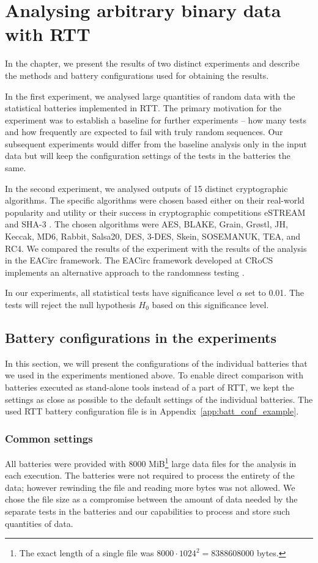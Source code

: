 \documentclass[
	digital,    %
	oneside,
	color,
	11pt,
	nocover,
	notable,
	nolof,
	nolot,
]{fithesis3}
\theoremstyle{definition}
\theoremstyle{remark}
\begin{document}
\chapter{Analysing arbitrary binary data with RTT}
\label{chap:crypto_fn_analysis}

In the chapter, we present the results of two distinct experiments and describe the methods and battery configurations used for obtaining the results.

In the first experiment, we analysed large quantities of random data with the statistical batteries implemented in RTT. The primary motivation for the experiment was to establish a baseline for further experiments -- how many tests and how frequently are expected to fail with truly random sequences. Our subsequent experiments would differ from the baseline analysis only in the input data but will keep the configuration settings of the tests in the batteries the same.

In the second experiment, we analysed outputs of 15 distinct cryptographic algorithms. The specific algorithms were chosen based either on their real-world popularity and utility or their success in cryptographic competitions eSTREAM \cite{estream-competition} and SHA-3 \cite{sha3-competition}. The chosen algorithms were AES, BLAKE, Grain, Gr\o stl, JH, Keccak, MD6, Rabbit, Salsa20, DES, 3-DES, Skein, SOSEMANUK, TEA, and RC4. We compared the results of the experiment with the results of the analysis in the EACirc framework. The EACirc framework developed at CRoCS implements an alternative approach to the randomness testing \cite{eacirc-github}.

In our experiments, all statistical tests have significance level $\alpha$ set to 0.01. The tests will reject the null hypothesis $H_0$ based on this significance level.

\section{Battery configurations in the experiments}
\label{sec:configuration_of_batteries}
In this section, we will present the configurations of the individual batteries that we used in the experiments mentioned above. To enable direct comparison with batteries executed as stand-alone tools instead of a part of RTT, we kept the settings as close as possible to the default settings of the individual batteries. The used RTT battery configuration file is in Appendix~\ref{app:batt_conf_example}.

\subsection{Common settings}
All batteries were provided with 8000 MiB\footnote{The exact length of a single file was $8000 \cdot 1024^2 = 8388608000$ bytes.} large data files for the analysis in each execution. The batteries were not required to process the entirety of the data; however rewinding the file and reading more bytes was not allowed. We chose the file size as a compromise between the amount of data needed by the separate tests in the batteries and our capabilities to process and store such quantities of data.
\end{document}
